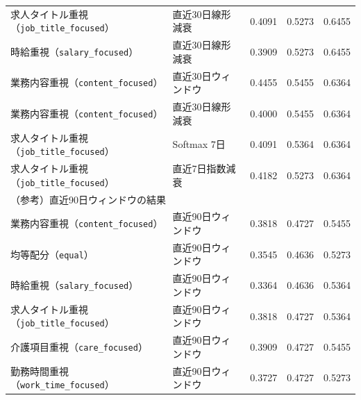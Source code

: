 \begin{tabularx}{\linewidth}{X X r r r}
求人タイトル重視（\texttt{job\_title\_focused}） & 直近30日線形減衰 & 0.4091 & 0.5273 & 0.6455 \\
時給重視（\texttt{salary\_focused}） & 直近30日線形減衰 & 0.3909 & 0.5273 & 0.6455 \\
業務内容重視（\texttt{content\_focused}） & 直近30日ウィンドウ & 0.4455 & 0.5455 & 0.6364 \\
業務内容重視（\texttt{content\_focused}） & 直近30日線形減衰 & 0.4000 & 0.5455 & 0.6364 \\
求人タイトル重視（\texttt{job\_title\_focused}） & Softmax 7日 & 0.4091 & 0.5364 & 0.6364 \\
求人タイトル重視（\texttt{job\_title\_focused}） & 直近7日指数減衰 & 0.4182 & 0.5273 & 0.6364 \\
\hline
\multicolumn{5}{l}{（参考）直近90日ウィンドウの結果}\\
業務内容重視（\texttt{content\_focused}） & 直近90日ウィンドウ & 0.3818 & 0.4727 & 0.5455 \\
均等配分（\texttt{equal}） & 直近90日ウィンドウ & 0.3545 & 0.4636 & 0.5273 \\
時給重視（\texttt{salary\_focused}） & 直近90日ウィンドウ & 0.3364 & 0.4636 & 0.5364 \\
求人タイトル重視（\texttt{job\_title\_focused}） & 直近90日ウィンドウ & 0.3818 & 0.4727 & 0.5364 \\
介護項目重視（\texttt{care\_focused}） & 直近90日ウィンドウ & 0.3909 & 0.4727 & 0.5455 \\
勤務時間重視（\texttt{work\_time\_focused}） & 直近90日ウィンドウ & 0.3727 & 0.4727 & 0.5273 \\
\hline
\end{tabularx}
